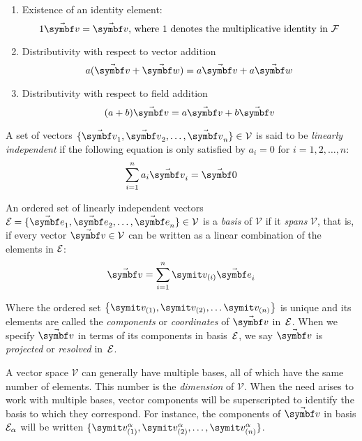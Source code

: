 \begin{enumerate}
\begin{enumerate}
	\item Existence of an identity element:
		\begin{equation} \label{Eq.Res.Vectors.MultId}
		1\vabs{v}=\vabs{v} \text{, where $1$ denotes the multiplicative identity in $\mathcal{F}$}
		\end{equation}
	\item Distributivity with respect to vector addition
		\begin{equation} \label{Eq.Res.Vectors.DistVect}
		a(\vabs{v}+\vabs{w})=a\vabs{v}+a\vabs{w}
		\end{equation}
	\item Distributivity with respect to field addition
		\begin{equation} \label{Eq.Res.Vectors.DistField}
		(a+b)\vabs{v}=a\vabs{v}+b\vabs{v}
		\end{equation}
\end{enumerate}
\end{enumerate}

A set of vectors $\{\vasub{v}{1},\vasub{v}{2},\dots,\vasub{v}{n}\} \in \mathcal{V}$ is said to be \emph{linearly independent} if the following equation is only satisfied by $a_i=0$ for $i=1,2,\dots,n$:
\begin{equation} \label{Eq.Def.Vectors.LinInd}
\sum_{i=1}^{n}{a_i \vasub{v}{i}} = \vabs{0}
\end{equation}

An ordered set of linearly independent vectors $\basis = \{\vasub{e}{1},\vasub{e}{2},\dots,\vasub{e}{n}\} \in \mathcal{V}$ is a \emph{basis} of $\mathcal{V}$ if it \emph{spans} $\mathcal{V}$, that is, if every vector $\vabs{v} \in \mathcal{V}$ can be written as a linear combination of the elements in $\basis$:
\begin{equation} \label{Eq.Def.Vectors.Spanning}
\vabs{v} = \sum_{i=1}^{n}{\cmp{v}{i} \vasub{e}{i}}
\end{equation}

Where the ordered set $\left\{\cmp{v}{1}, \cmp{v}{2},\dots \cmp{v}{n}\right\}$ is unique and its elements are called the \emph{components} or \emph{coordinates} of $\vabs{v}$ in~$\basis$. When we specify $\vabs{v}$ in terms of its components in basis~$\basis$, we say $\vabs{v}$ is \emph{projected} or \emph{resolved} in~$\basis$.

A vector space $\mathcal{V}$ can generally have multiple bases, all of which have the same number of elements. This number is the \emph{dimension} of $\mathcal{V}$. When the need arises to work with multiple bases, vector components will be superscripted to identify the basis to which they correspond. For instance, the components of $\vabs{v}$ in basis $\basis[\alpha]$ will be written $\{\cprj{v}{\alpha}{1}, \cprj{v}{\alpha}{2}, \dots, \cprj{v}{\alpha}{n}\}$.

